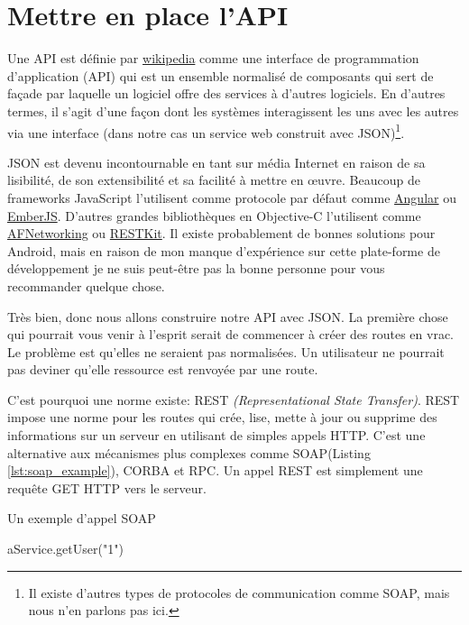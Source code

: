 \documentclass[]{report}
\begin{document}
  \section{Mettre en place l'API}\label{section:setup_api}

    Une API est définie par \href{https://fr.wikipedia.org/wiki/Interface_de_programmation}{wikipedia} comme une interface de programmation d'application (API) qui  est un ensemble normalisé de composants qui sert de façade par laquelle un logiciel offre des services à d'autres logiciels. En d'autres termes, il s'agit d'une façon dont les systèmes interagissent les uns avec les autres via une interface (dans notre cas un service web construit avec JSON)\footnote{Il existe d'autres types de protocoles de communication comme SOAP, mais nous n'en parlons pas ici.}.

    JSON est devenu incontournable en tant sur média Internet en raison de sa lisibilité, de son extensibilité et sa facilité à mettre en œuvre. Beaucoup de frameworks JavaScript l'utilisent comme protocole par défaut comme \href{https://angularjs.org/}{Angular} ou \href{http://emberjs.com/}{EmberJS}. D'autres grandes bibliothèques en Objective-C l'utilisent  comme \href{https://github.com/AFNetworking/AFNetworking}{AFNetworking} ou \href{http://restkit.org/}{RESTKit}. Il existe probablement de bonnes solutions pour Android, mais en raison de mon manque d'expérience sur cette plate-forme de développement je ne suis peut-être pas la bonne personne pour vous recommander quelque chose.

    Très bien, donc nous allons construire notre API avec JSON. La première chose qui pourrait vous venir à l'esprit serait de commencer à créer des routes en vrac. Le problème est qu'elles ne seraient pas normalisées. Un utilisateur ne pourrait pas deviner qu'elle ressource est renvoyée par une route.

    C'est pourquoi une norme existe: REST \textit{(Representational State Transfer)}. REST impose une norme pour les routes qui crée, lise, mette à jour ou supprime des informations sur un serveur en utilisant de simples appels HTTP. C'est une alternative aux mécanismes plus complexes comme SOAP(Listing \ref{lst:soap_example}), CORBA et RPC. Un appel REST est simplement une requête GET HTTP vers le serveur.

    \begin{listing}
      \label{lst:soap_example}
      \caption{Un exemple d'appel SOAP}
      \begin{rubycode}
      aService.getUser("1")
      \end{rubycode}
    \end{listing}
\end{document}
